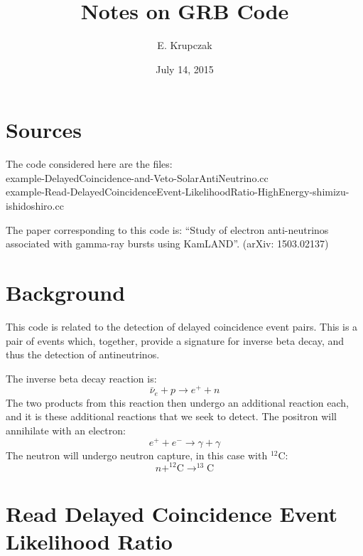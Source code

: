 \documentclass{article}
\title{Notes on GRB Code}
\author{E. Krupczak}
\date{July 14, 2015}
\begin{document}
\maketitle

\section{Sources}
The code considered here are the files:
\\ example-DelayedCoincidence-and-Veto-SolarAntiNeutrino.cc
\\ example-Read-DelayedCoincidenceEvent-LikelihoodRatio-HighEnergy-shimizu-ishidoshiro.cc

The paper corresponding to this code is:
``Study of electron anti-neutrinos associated with gamma-ray bursts using KamLAND''. (arXiv: 1503.02137) 

\section{Background}
This code is related to the detection of delayed coincidence event pairs. This is a pair of events which, together, provide a signature for inverse beta decay, and thus the detection of antineutrinos. 

The inverse beta decay reaction is: 
$$\bar \nu_e + p \rightarrow e^+ +n$$
The two products from this reaction then undergo an additional reaction each, and it is these additional reactions that we seek to detect. 
The positron will annihilate with an electron:
$$e^+ + e^- \rightarrow \gamma + \gamma$$
The neutron will undergo neutron capture, in this case with $^{12}$C:
$$n + ^{12}\mbox{C} \rightarrow ^{13}\mbox{C}$$


\section{Read Delayed Coincidence Event Likelihood Ratio}
\end{document}
